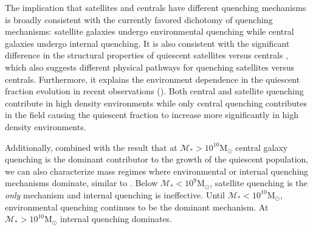 The implication that satellites and centrals have different quenching 
mechanisms is broadly consistent with the currently favored dichotomy of 
quenching mechanisms: satellite galaxies undergo environmental 
quenching while central galaxies undergo internal quenching. 
It is also consistent with the significant difference in the structural 
properties of quiescent satellites versus centrals \citep{Woo:2016aa}, 
which also suggests different physical pathways for quenching
satellites versus centrals.
Furthermore, it explains the environment dependence in the quiescent fraction 
evolution in recent observations (\citealt{Hahn:2015aa, Darvish:2016aa}). 
Both central and satellite quenching contribute in high density 
environments while only central quenching contributes in the field 
causing the quiescent fraction to increase more significantly in high
density environments. 

Additionally, combined with the \cite{Wetzel:2013aa} 
result that at $\mathcal{M}_* > 10^{10} \mathrm{M}_\odot$ central 
galaxy quenching is the dominant contributor to the growth of the 
quiescent population, we can also characterize mass regimes where 
environmental or internal quenching mechanisms dominate, similar to 
\cite{Peng:2010aa}. 
Below $\mathcal{M}_* < 10^{9} \mathrm{M}_\odot$, satellite quenching 
is the {\em only} mechanism \citep{Geha:2012aa} and internal quenching 
is ineffective. Until $\mathcal{M}_* < 10^{10} \mathrm{M}_\odot$, 
environmental quenching continues to be the dominant mechanism. At 
$\mathcal{M}_* > 10^{10} \mathrm{M}_\odot$ internal quenching 
dominates.

